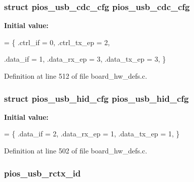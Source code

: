 \hypertarget{group___open_pilot_core_ga05cc3e449d417c7f9097d2659e6f5ca3}{
\subsubsection[{pios\-\_\-usb\-\_\-cdc\-\_\-cfg}]{\setlength{\rightskip}{0pt plus 5cm}struct {\bf pios\-\_\-usb\-\_\-cdc\-\_\-cfg} {\bf pios\-\_\-usb\-\_\-cdc\-\_\-cfg}}}\label{group___open_pilot_core_ga05cc3e449d417c7f9097d2659e6f5ca3}
{\bfseries Initial value\-:}
\begin{DoxyCode}
= \{
        .ctrl\_if = 0,
        .ctrl\_tx\_ep = 2,

        .data\_if = 1,
        .data\_rx\_ep = 3,
        .data\_tx\_ep = 3,
\}
\end{DoxyCode}


Definition at line 512 of file board\-\_\-hw\-\_\-defs.\-c.

\hypertarget{group___open_pilot_core_ga3665f6d3a2cccc431b55b9432291e94c}{
\subsubsection[{pios\-\_\-usb\-\_\-hid\-\_\-cfg}]{\setlength{\rightskip}{0pt plus 5cm}struct {\bf pios\-\_\-usb\-\_\-hid\-\_\-cfg} {\bf pios\-\_\-usb\-\_\-hid\-\_\-cfg}}}\label{group___open_pilot_core_ga3665f6d3a2cccc431b55b9432291e94c}
{\bfseries Initial value\-:}
\begin{DoxyCode}
= \{
        .data\_if = 2,
        .data\_rx\_ep = 1,
        .data\_tx\_ep = 1,
\}
\end{DoxyCode}


Definition at line 502 of file board\-\_\-hw\-\_\-defs.\-c.

\hypertarget{group___open_pilot_core_ga310e72613cea7a03a60834289dbe42a5}{
\subsubsection[{pios\-\_\-usb\-\_\-rctx\-\_\-id}]{ pios\-\_\-usb\-\_\-rctx\-\_\-id}}\label{group___open_pilot_core_ga310e72613cea7a03a60834289dbe42a5}


